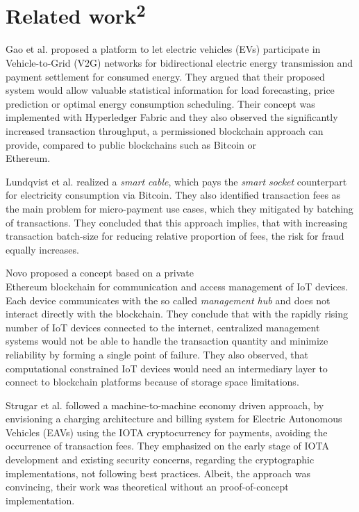 \section{Related work\textsuperscript{2}}
Gao et al. \cite{8338177} proposed a platform to let electric vehicles (EVs) participate in Vehicle-to-Grid (V2G) networks for bidirectional electric energy transmission and payment settlement for consumed energy. They argued that their proposed system would allow valuable statistical information for load forecasting, price prediction or optimal energy consumption scheduling. Their concept was implemented with Hyperledger Fabric and they also observed the significantly increased transaction throughput, a permissioned blockchain approach can provide, compared to public blockchains such as Bitcoin or \\ Ethereum.

Lundqvist et al. \cite{8016254} realized a \textit{smart cable}, which pays the \textit{smart socket} counterpart for electricity consumption via Bitcoin. They also identified transaction fees as the main problem for micro-payment use cases, which they mitigated by batching of transactions. They concluded that this approach implies, that with increasing transaction batch-size for reducing relative proportion of fees, the risk for fraud equally increases.  

Novo \cite{8306880} proposed a concept based on a private \\ Ethereum blockchain for communication and access management of IoT devices. Each device communicates with the so called \textit{management hub} and  does not interact directly with the blockchain. They conclude that with the rapidly rising number of IoT devices connected to the internet, centralized management systems would not be able to handle the transaction quantity and minimize reliability by forming a single point of failure. They also observed, that computational constrained IoT devices would need an intermediary layer to connect to blockchain platforms because of storage space limitations.

Strugar et al. \cite{DBLP:journals/corr/abs-1804-00658} followed a machine-to-machine economy driven approach, by envisioning a charging architecture and billing system for Electric Autonomous Vehicles (EAVs) using the IOTA cryptocurrency for payments, avoiding the occurrence of transaction fees. They emphasized on the early stage of IOTA development and existing security concerns, regarding the cryptographic implementations, not following best practices. Albeit, the approach was convincing, their work was theoretical without an proof-of-concept implementation.


